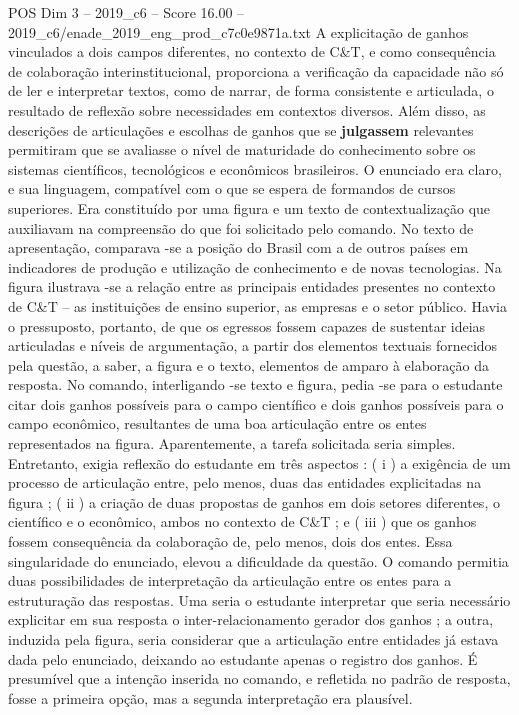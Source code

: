 \begin{textsample}{POS Dim 3 – 2019\_c6 – Score 16.00 – 2019\_c6/enade\_2019\_eng\_prod\_c7c0e9871a.txt}
A explicitação de ganhos vinculados a dois campos diferentes, no contexto de C\&T, e como consequência de colaboração interinstitucional, proporciona a verificação da capacidade não só de ler e interpretar textos, como de narrar, de forma consistente e articulada, o resultado de reflexão sobre necessidades em contextos diversos.
Além disso, as descrições de articulações e escolhas de ganhos que se \textbf{julgassem} relevantes permitiram que se avaliasse o nível de maturidade do conhecimento sobre os sistemas científicos, tecnológicos e econômicos brasileiros.
O enunciado era claro, e sua linguagem, compatível com o que se espera de formandos de cursos superiores.
Era constituído por uma figura e um texto de contextualização que auxiliavam na compreensão do que foi solicitado pelo comando.
No texto de apresentação, comparava -se a posição do Brasil com a de outros países em indicadores de produção e utilização de conhecimento e de novas tecnologias.
Na figura ilustrava -se a relação entre as principais entidades presentes no contexto de C\&T – as instituições de ensino superior, as empresas e o setor público.
Havia o pressuposto, portanto, de que os egressos fossem capazes de sustentar ideias articuladas e níveis de argumentação, a partir dos elementos textuais fornecidos pela questão, a saber, a figura e o texto, elementos de amparo à elaboração da resposta.
No comando, interligando -se texto e figura, pedia -se para o estudante citar dois ganhos possíveis para o campo científico e dois ganhos possíveis para o campo econômico, resultantes de uma boa articulação entre os entes representados na figura.
Aparentemente, a tarefa solicitada seria simples.
Entretanto, exigia reflexão do estudante em três aspectos : ( i ) a exigência de um processo de articulação entre, pelo menos, duas das entidades explicitadas na figura ; ( ii ) a criação de duas propostas de ganhos em dois setores diferentes, o científico e o econômico, ambos no contexto de C\&T ; e ( iii ) que os ganhos fossem consequência da colaboração de, pelo menos, dois dos entes.
Essa singularidade do enunciado, elevou a dificuldade da questão.
O comando permitia duas possibilidades de interpretação da articulação entre os entes para a estruturação das respostas.
Uma seria o estudante interpretar que seria necessário explicitar em sua resposta o inter-relacionamento gerador dos ganhos ; a outra, induzida pela figura, seria considerar que a articulação entre entidades já estava dada pelo enunciado, deixando ao estudante apenas o registro dos ganhos.
É presumível que a intenção inserida no comando, e refletida no padrão de resposta, fosse a primeira opção, mas a segunda interpretação era plausível.

\end{textsample}
